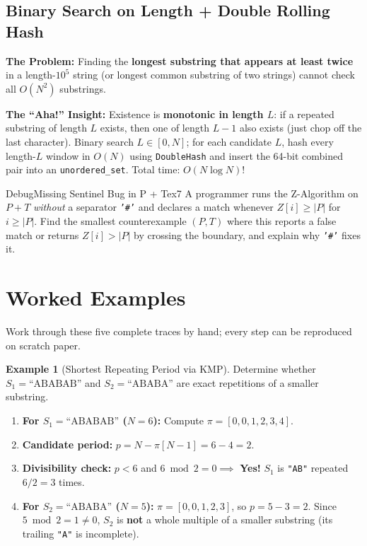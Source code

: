 \documentclass[11pt,a4paper]{article}
\theoremstyle{definition}
\newtheorem{example}{Example}[section]
\newcommand{\painbeat}{\textbf{\color{accentamber}The Problem:} }
\newcommand{\ahabeat}{\textbf{\color{accentteal}The ``Aha!'' Insight:} }
\begin{document}
\subsection{Binary Search on Length + Double Rolling Hash}

\painbeat Finding the \textbf{longest substring that appears at least twice} in a length-$10^5$ string (or longest common substring of two strings) cannot check all $O(N^2)$ substrings.

\ahabeat Existence is \textbf{monotonic in length $L$}: if a repeated substring of length $L$ exists, then one of length $L - 1$ also exists (just chop off the last character). Binary search $L \in [0, N]$; for each candidate $L$, hash every length-$L$ window in $O(N)$ using \texttt{DoubleHash} and insert the 64-bit combined pair into an \texttt{unordered\_set}. Total time: $O(N \log N)$!

\begin{tryitbox}{Debug}{Missing Sentinel Bug in P + T}{ex7}
A programmer runs the Z-Algorithm on $P + T$ \emph{without} a separator \texttt{'\#'} and declares a match whenever $Z[i] \ge |P|$ for $i \ge |P|$. Find the smallest counterexample $(P, T)$ where this reports a false match or returns $Z[i] > |P|$ by crossing the boundary, and explain why \texttt{'\#'} fixes it.
\end{tryitbox}

\section{Worked Examples}

Work through these five complete traces by hand; every step can be reproduced on scratch paper.

\begin{example}[Shortest Repeating Period via KMP]
Determine whether $S_1 = \text{``ABABAB''}$ and $S_2 = \text{``ABABA''}$ are exact repetitions of a smaller substring.
\begin{enumerate}
    \item \textbf{For $S_1 = \text{``ABABAB''}$ ($N = 6$):} Compute $\pi = [0, 0, 1, 2, 3, 4]$.
    \item \textbf{Candidate period:} $p = N - \pi[N - 1] = 6 - 4 = 2$.
    \item \textbf{Divisibility check:} $p < 6$ and $6 \bmod 2 = 0 \implies$ \textbf{Yes!} $S_1$ is \texttt{"AB"} repeated $6 / 2 = 3$ times.
    \item \textbf{For $S_2 = \text{``ABABA''}$ ($N = 5$):} $\pi = [0, 0, 1, 2, 3]$, so $p = 5 - 3 = 2$. Since $5 \bmod 2 = 1 \neq 0$, $S_2$ is \textbf{not} a whole multiple of a smaller substring (its trailing \texttt{"A"} is incomplete).
\end{enumerate}
\end{example}
\end{document}
